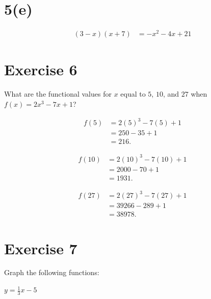 \documentclass[12pt]{article}
\newenvironment{problem}
    {\begin{lrbox}{\mybox}\begin{minipage}{0.98\textwidth}}
    {\end{minipage}\end{lrbox}\begin{center}\framebox[\textwidth]{\usebox{\mybox}}\end{center}}
\begin{document}
\section*{5(e)}
\begin{align*}
    (3 - x)(x + 7) &= -x^2 - 4x + 21
\end{align*}

\section*{Exercise 6}
\begin{problem}
    What are the functional values for $x$ equal to $5$, $10$, and $27$ when $f(x) = 2x^3 - 7x + 1$?
\end{problem}

\begin{align*}
    f(5) &= 2(5)^3 - 7(5) + 1 \\
        &= 250 - 35 + 1 \\
        &= 216.
\end{align*}

\begin{align*}
    f(10) &= 2(10)^3 - 7(10) + 1 \\
        &= 2000 - 70 + 1 \\
        &= 1931.
\end{align*}

\begin{align*}
    f(27) &= 2(27)^3 - 7(27) + 1 \\
        &= 39266 - 289 + 1 \\
        &= 38978.
\end{align*}


\section*{Exercise 7}
\begin{problem}
    Graph the following functions:
\end{problem}

$y=\frac{1}{3}x-5$
\end{document}
